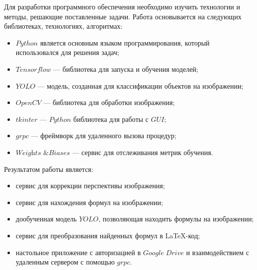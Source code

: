 Для разработки программного обеспечения необходимо изучить технологии и методы, решающие поставленные задачи. Работа основывается на следующих библиотеках, технологиях, алгоритмах:
\begin{itemize}
    \item $Python$ является основным языком программирования, который использовался для решения задач;
    \item $Tensorflow$ --- библиотека для запуска и обучения моделей;
    \item $YOLO$ --- модель, созданная для классификации объектов на изображении;
    \item $OpenCV$ --- библиотека для обработки изображения;
    \item $tkinter$ --- $Python$ библиотека для работы с $GUI$;
    \item $grpc$ --- фреймворк для удаленного вызова процедур;
    \item $\textit{Weights \& Biases}$ --- сервис для отслеживания метрик обучения.
\end{itemize}

Результатом работы является:
\begin{itemize}
    \item сервис для коррекции перспективы изображения;
    \item сервис для нахождения формул на изображении;
    \item дообученная модель $YOLO$, позволяющая находить формулы на изображении;
    \item сервис для преобразования найденных формул в \LaTeX-код;
    \item настольное приложение с авторизацией в $Google\; Drive$ и взаимодействием с удаленным сервером с помощью $grpc$.
\end{itemize}